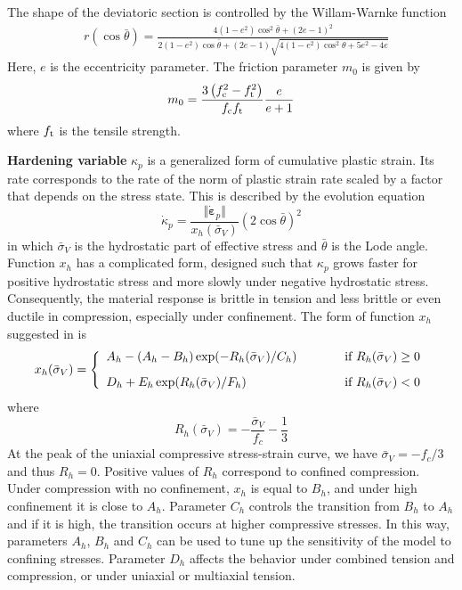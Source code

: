 \documentclass[a4paper]{article}
\begin{document}
The shape of the deviatoric section is controlled by the Willam-Warnke function
\begin{equation} \label{eq:rFunction}
\begin{split}
&r(\cos{\bar{\theta}}) = \frac{4(1-e^2)\cos^2{\bar{\theta}} + (2e-1)^2}{2(1-e^2)\cos{\bar{\theta}} + (2e-1)\sqrt{4(1-e^2)\cos^2{\bar{\theta}}+5e^2 -4e}} 
\end{split}
\end{equation} 
Here, $e$ is the eccentricity parameter.
The friction parameter $m_0$ is given by 
\begin{equation}\label{eq:frictionM}
m_0 = \dfrac{3 \left(f_{\rm c}^2 - f_{\rm t}^2\right)}{f_{\rm c}f_{\rm t}} \dfrac{e}{e+1}
\end{equation}
where $f_{\rm t}$ is the tensile strength.

{\bf Hardening variable} $\kappa_p$ is a generalized form of
cumulative plastic strain. Its rate corresponds to the rate
of the norm of plastic strain rate scaled by a factor that
depends on the stress state. This is described by the evolution
equation
\begin{equation}
  \dot{\kappa}_p =\frac{\Vert\dot{\boldsymbol{\varepsilon}}_p\Vert}{x_h(\bar{\sigma}_V)}\left(2\cos\bar{\theta}\right)^2
\end{equation}
in which $\bar{\sigma}_V$ is the hydrostatic part of effective stress
and $\bar{\theta}$ is the Lode angle. Function $x_h$ has a complicated form, designed such that
$\kappa_p$ grows faster for positive hydrostatic stress and more slowly
under negative hydrostatic stress. Consequently, the material response
is brittle in tension and less brittle or even ductile in compression,
especially under confinement. The form of function $x_h$ suggested
in \cite{GraXenNys13} is
\begin{equation}\label{eq:xh}
x_h(\bar{\sigma}_V) = \left\{\begin{array}{ll}
A_h-(A_h-B_h)\exp(-R_h(\bar{\sigma}_V)/C_h) & \hskip 10mm \mbox{if } R_h(\bar{\sigma}_V) \ge 0
\\[3mm]
D_h + E_h\exp(R_h(\bar{\sigma}_V)/F_h) & \hskip 10mm \mbox{if } R_h(\bar{\sigma}_V) < 0
\end{array}\right.
\end{equation}
where
\begin{equation}
 R_h(\bar{\sigma}_V) = -\frac{\bar{\sigma}_V}{f_c}-\frac{1}{3}
\end{equation}
At the peak of the 
uniaxial compressive stress-strain curve, we have $\bar{\sigma}_V=-f_c/3$
and thus $R_h=0$. Positive values of $R_h$ correspond to confined
compression. Under compression with no confinement, $x_h$ is equal to $B_h$, and under high confinement
it is close to $A_h$. Parameter $C_h$ controls the transition from
$B_h$ to $A_h$ and if it is high, the transition occurs at higher 
compressive stresses. In this way, parameters $A_h$, $B_h$ and $C_h$
can be used to tune up the sensitivity of the model to confining
stresses. Parameter $D_h$ affects the behavior under combined
tension and compression, or under uniaxial or multiaxial tension.
\end{document}
